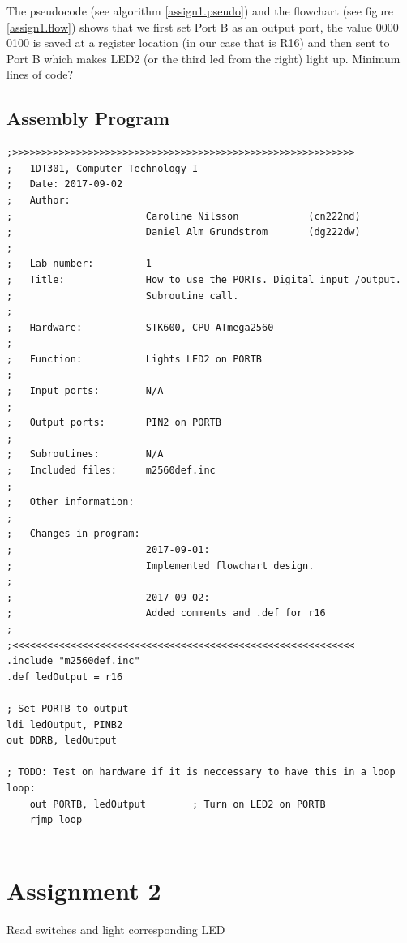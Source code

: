 \documentclass[a4paper, 12pt]{article}
\begin{document}
The pseudocode (see algorithm \ref{assign1.pseudo}) and the flowchart (see figure \ref{assign1.flow}) shows that we first set Port B as an output port, the value 0000 0100 is saved at a register location (in our case that is R16) and then sent to Port B which makes LED2 (or the third led from the right) light up. 
Minimum lines of code?
\newpage
\subsection{Assembly Program}
\begin{lstlisting}[basicstyle=\tiny]
;>>>>>>>>>>>>>>>>>>>>>>>>>>>>>>>>>>>>>>>>>>>>>>>>>>>>>>>>>>>
;   1DT301, Computer Technology I
;   Date: 2017-09-02
;   Author:
;                       Caroline Nilsson            (cn222nd)
;                       Daniel Alm Grundstrom       (dg222dw)
;
;   Lab number:         1
;   Title:              How to use the PORTs. Digital input /output.
;                       Subroutine call.
;
;   Hardware:           STK600, CPU ATmega2560
;
;   Function:           Lights LED2 on PORTB
;
;   Input ports:        N/A
;
;   Output ports:       PIN2 on PORTB
;
;   Subroutines:        N/A
;   Included files:     m2560def.inc
;
;   Other information:
;
;   Changes in program: 
;                       2017-09-01:
;                       Implemented flowchart design.
;
;                       2017-09-02:
;                       Added comments and .def for r16
;
;<<<<<<<<<<<<<<<<<<<<<<<<<<<<<<<<<<<<<<<<<<<<<<<<<<<<<<<<<<<
.include "m2560def.inc"
.def ledOutput = r16

; Set PORTB to output
ldi ledOutput, PINB2
out DDRB, ledOutput

; TODO: Test on hardware if it is neccessary to have this in a loop
loop:
    out PORTB, ledOutput        ; Turn on LED2 on PORTB
    rjmp loop


\end{lstlisting}

\newpage

\section{Assignment 2}
\begin{algorithm}
\begin{algorithmic}
\Repeat
{} 
\Until{$\infty$}
\EndProcedure
\caption{Read switches and light corresponding LED}
\label{assign2.pseudo}
\end{algorithmic}
\end{algorithm}
\end{document}
